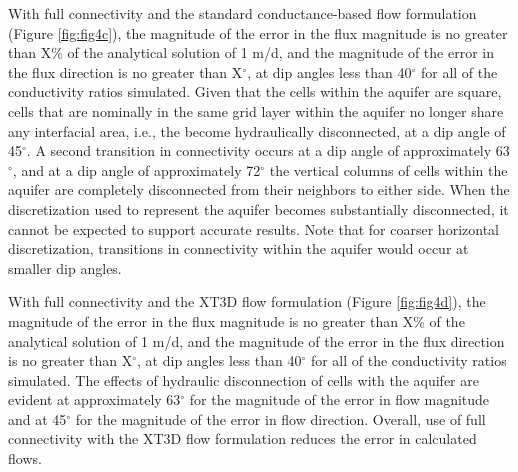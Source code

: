 \documentclass{article}
\begin{document}
With full connectivity and the standard conductance-based flow formulation (Figure \ref{fig:fig4c}), the magnitude of the error in the flux magnitude is no greater than {\color{red}X}\% of the analytical solution of 1 m/d, and the magnitude of the error in the flux direction is no greater than {\color{red}X}$^{\circ}$, at dip angles less than 40$^{\circ}$ for all of the conductivity ratios simulated. Given that the cells within the aquifer are square, cells that are nominally in the same grid layer within the aquifer no longer share any interfacial area, i.e., the become hydraulically disconnected, at a dip angle of 45$^{\circ}$. A second transition in connectivity occurs at a dip angle of approximately 63$^{\circ}$, and at a dip angle of approximately 72$^{\circ}$ the vertical columns of cells within the aquifer are completely disconnected from their neighbors to either side. When the discretization used to represent the aquifer becomes substantially disconnected, it cannot be expected to support accurate results. Note that for coarser horizontal discretization, transitions in connectivity within the aquifer would occur at smaller dip angles.

With full connectivity and the XT3D flow formulation (Figure \ref{fig:fig4d}), the magnitude of the error in the flux magnitude is no greater than {\color{red}X}\% of the analytical solution of 1 m/d, and the magnitude of the error in the flux direction is no greater than {\color{red}X}$^{\circ}$, at dip angles less than 40$^{\circ}$ for all of the conductivity ratios simulated. The effects of hydraulic disconnection of cells with the aquifer are evident at approximately 63$^{\circ}$ for the magnitude of the error in flow magnitude and at 45$^{\circ}$  for the magnitude of the error in flow direction. Overall, use of full connectivity with the XT3D flow formulation reduces the error in calculated flows.
\end{document}
